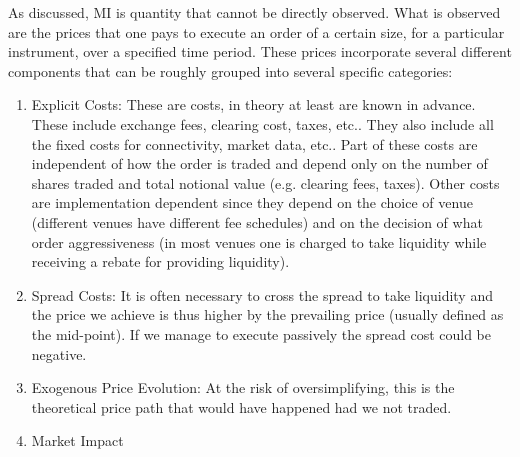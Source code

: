 As discussed, MI is quantity that cannot be directly observed. What is observed are the prices that one pays to execute an order of a certain size, for a particular instrument, over a specified time period. These prices incorporate several different components that can be roughly grouped into several specific categories:
\begin{enumerate}
\item Explicit Costs: These are costs, in theory at least are known in advance. These include exchange fees, clearing cost, taxes, etc.. They also include all the fixed costs for connectivity, market data, etc.. Part of these costs are independent of how the order is traded and depend only on the number of shares traded and total notional value (e.g. clearing fees, taxes). Other costs are implementation dependent since they depend on the choice of venue (different venues have different fee schedules) and on the decision of what order aggressiveness (in most venues one is charged to take liquidity while receiving a rebate for providing liquidity).
\item Spread Costs: It is often necessary to cross the spread to take liquidity and the price we achieve is thus higher by the prevailing price (usually defined as the mid-point). If we manage to execute passively the spread cost could be negative.
\item Exogenous Price Evolution: At the risk of oversimplifying, this is the theoretical price path that would have happened had we not traded.
\item Market Impact
\end{enumerate}


